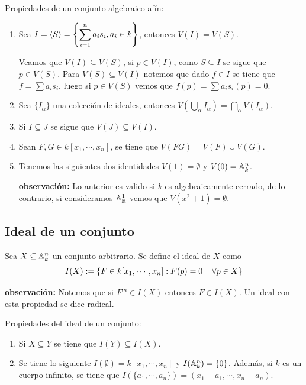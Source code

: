 \documentclass{article}
\begin{document}
\noindent Propiedades de un conjunto algebraico afín:
\begin{enumerate}
    \item Sea $I=\left\langle{S}\right\rangle=\left\{\displaystyle\sum_{i=1}^{n}a_{i}s_{i},a_{i}\in k\right\}$, entonces 
    $V(I)=V(S)$.
    \begin{dem}
        Veamos que $V(I)\subseteq V(S)$, si $p\in V(I)$, como $S\subseteq I$ se sigue que 
        $p\in V(S)$. Para $V(S)\subseteq V(I)$ notemos que dado $f\in I$ se tiene que 
        $f=\sum a_{i}s_{i}$, luego si $p\in V(S)$ vemos que $f(p)=\sum a_{i}s_{i}(p)=0$.
    \end{dem}

    \item Sea $\{I_{\alpha}\}$ una colección de ideales, entonces 
    $V(\bigcup_{\alpha}I_{\alpha})=\bigcap_{\alpha}V(I_{\alpha})$.
    \item Si $I\subseteq J$ se sigue que $V(J)\subseteq V(I)$.
    \item Sean $F,G\in k[x_{1},\cdots,x_{n}]$, se tiene que $V(FG)=V(F)\cup V(G)$.
    \item Tenemos las siguientes dos identidades $V(1)=\emptyset$ y $V(0)=\mathbb{A}_{k}^{n}$.
    
    \textbf{observación:} Lo anterior es valido si $k$ es algebraicamente cerrado, de lo 
    contrario, si consideramos $\mathbb{A}_{\mathbb{R}}^{1}$ vemos que $V(x^{2}+1)=\emptyset$.
\end{enumerate}

\subsection{Ideal de un conjunto}
\begin{dfn}
    Sea $X\subseteq\mathbb{A}_{k}^{n}$ un conjunto arbitrario. Se define el ideal de $X$ como
    \begin{equation*}
        I(X):=\left\{F\in k[x_{1},\cdots,x_{n}]:F(p)=0\hspace{4mm}\forall p\in X\right\}
    \end{equation*}
\end{dfn}

\noindent\textbf{observación:} Notemos que si $F^{m}\in I(X)$ entonces $F\in I(X)$. Un ideal con
esta propiedad se dice radical.
\vspace{4mm}

\noindent Propiedades del ideal de un conjunto:
\begin{enumerate}
    \item Si $X\subseteq Y$ se tiene que $I(Y)\subseteq I(X)$.
    \item Se tiene lo siguiente $I(\emptyset)=k[x_{1},\cdots,x_{n}]$ y $I(\mathbb{A}_{k}^{n})=\{0\}$.
    Además, si $k$ es un cuerpo infinito, se tiene que $I(\{a_{1},\cdots,a_{n}\})=
    (x_{1}-a_{1},\cdots,x_{n}-a_{n})$.
\end{enumerate}
\end{document}
